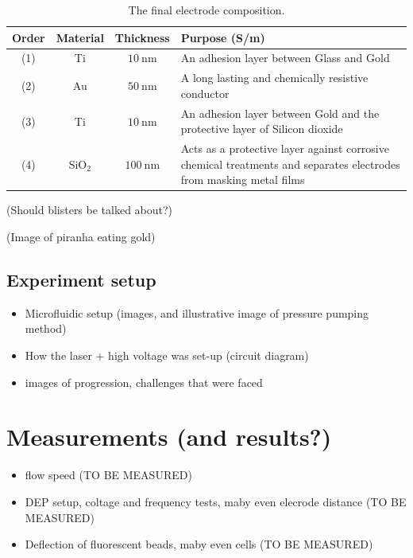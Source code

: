 \documentclass[draft]{jyflluk}
\begin{document}
\begin{table}[h]
    \centering
    \caption{The final electrode composition.}
    \label{tab:electrde}
    \begin{tabular}{||c c c p{10cm}||} \toprule
       Order    & Material & Thickness & Purpose (S/m)\\ \midrule
       (1)   &  Ti  &  $\SI{10}{\nano \metre}$  & An adhesion layer between Glass and Gold     \\ \hline
       (2)  &  Au  &  $\SI{50}{\nano \metre}$ & A long lasting and chemically resistive conductor \\\hline
       (3)  &  Ti  &  $\SI{10}{\nano \metre}$ & An adhesion layer between Gold and the protective layer of Silicon dioxide\\\hline
       (4)   &  $\mathrm{SiO_2}$  &  $\SI{100}{\nano \metre}$  & Acts as a protective layer against corrosive chemical treatments and separates electrodes from masking metal films    \\
         \bottomrule
    \end{tabular}
 \end{table}

(Should blisters be talked about?)

(Image of piranha eating gold)

\subsection{Experiment setup}
\label{sec:xxx5}
\begin{itemize}
    \item Microfluidic setup (images, and illustrative image of pressure pumping method)
    \item How the laser + high voltage was set-up (circuit diagram)
    \item images of progression, challenges that were faced
\end{itemize}



\section{Measurements (and results?)}
\label{sec:results}
\begin{itemize}
    \item flow speed (TO BE MEASURED)
    \item DEP setup, coltage and frequency tests, maby even elecrode distance (TO BE MEASURED)
    \item Deflection of fluorescent beads, maby even cells (TO BE MEASURED)
\end{itemize}
\end{document}
